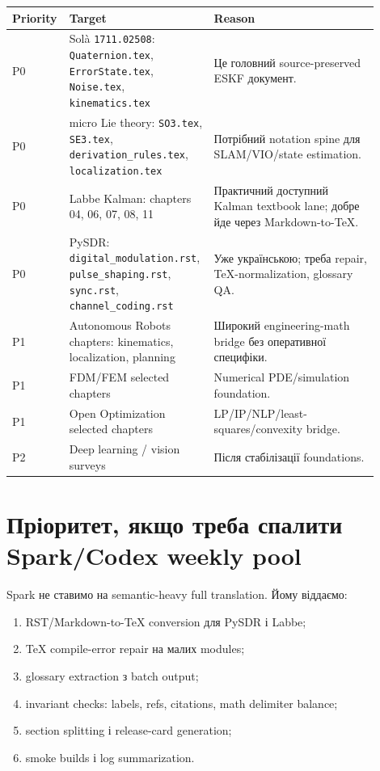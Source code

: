 \begin{longtable}{L{0.12\linewidth}L{0.34\linewidth}L{0.44\linewidth}}
\toprule
Priority & Target & Reason \\
\midrule
P0 & Solà \texttt{1711.02508}: \texttt{Quaternion.tex}, \texttt{ErrorState.tex}, \texttt{Noise.tex}, \texttt{kinematics.tex} & Це головний source-preserved ESKF документ. \\
P0 & micro Lie theory: \texttt{SO3.tex}, \texttt{SE3.tex}, \texttt{derivation\_rules.tex}, \texttt{localization.tex} & Потрібний notation spine для SLAM/VIO/state estimation. \\
P0 & Labbe Kalman: chapters 04, 06, 07, 08, 11 & Практичний доступний Kalman textbook lane; добре йде через Markdown-to-TeX. \\
P0 & PySDR: \texttt{digital\_modulation.rst}, \texttt{pulse\_shaping.rst}, \texttt{sync.rst}, \texttt{channel\_coding.rst} & Уже українською; треба repair, TeX-normalization, glossary QA. \\
P1 & Autonomous Robots chapters: kinematics, localization, planning & Широкий engineering-math bridge без оперативної специфіки. \\
P1 & FDM/FEM selected chapters & Numerical PDE/simulation foundation. \\
P1 & Open Optimization selected chapters & LP/IP/NLP/least-squares/convexity bridge. \\
P2 & Deep learning / vision surveys & Після стабілізації foundations. \\
\bottomrule
\end{longtable}

\section{Пріоритет, якщо треба спалити Spark/Codex weekly pool}

Spark не ставимо на semantic-heavy full translation. Йому віддаємо:
\begin{enumerate}[label=\arabic*.]
\item RST/Markdown-to-TeX conversion для PySDR і Labbe;
\item TeX compile-error repair на малих modules;
\item glossary extraction з batch output;
\item invariant checks: labels, refs, citations, math delimiter balance;
\item section splitting і release-card generation;
\item smoke builds і log summarization.
\end{enumerate}


